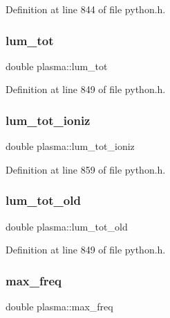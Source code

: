 Definition at line 844 of file python.\+h.

\mbox{\label{structplasma_a9e5f8826f902ac5154fc3c4c67f404e1}} 
\subsubsection{\texorpdfstring{lum\+\_\+tot}{lum\_tot}}
{\footnotesize\ttfamily double plasma\+::lum\+\_\+tot}



Definition at line 849 of file python.\+h.

\mbox{\label{structplasma_af27d3aeeb9b6c87198ebe89c7990ff48}} 
\subsubsection{\texorpdfstring{lum\+\_\+tot\+\_\+ioniz}{lum\_tot\_ioniz}}
{\footnotesize\ttfamily double plasma\+::lum\+\_\+tot\+\_\+ioniz}



Definition at line 859 of file python.\+h.

\mbox{\label{structplasma_ae0685b14cba52ec98d560c7981e765bf}} 
\subsubsection{\texorpdfstring{lum\+\_\+tot\+\_\+old}{lum\_tot\_old}}
{\footnotesize\ttfamily double plasma\+::lum\+\_\+tot\+\_\+old}



Definition at line 849 of file python.\+h.

\mbox{\label{structplasma_ac6f1afeb2ed92f59b12ca628a4e75eff}} 
\subsubsection{\texorpdfstring{max\+\_\+freq}{max\_freq}}
{\footnotesize\ttfamily double plasma\+::max\+\_\+freq}



